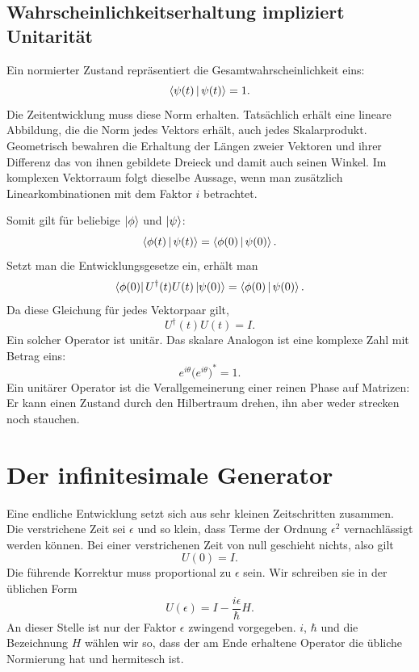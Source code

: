 \subsection{Wahrscheinlichkeitserhaltung impliziert Unitarität}

Ein normierter Zustand repräsentiert die Gesamtwahrscheinlichkeit eins:
\begin{equation}
\left\langle\psi(t)\,\middle|\,\psi(t)\right\rangle=1.
\end{equation}
Die Zeitentwicklung muss diese Norm erhalten. Tatsächlich erhält eine lineare Abbildung, die die Norm jedes Vektors erhält, auch jedes Skalarprodukt. Geometrisch bewahren die Erhaltung der Längen zweier Vektoren und ihrer Differenz das von ihnen gebildete Dreieck und damit auch seinen Winkel. Im komplexen Vektorraum folgt dieselbe Aussage, wenn man zusätzlich Linearkombinationen mit dem Faktor \(i\) betrachtet.

Somit gilt für beliebige \(\left\lvert\phi\right\rangle\) und \(\left\lvert\psi\right\rangle\):
\begin{equation}
\left\langle\phi(t)\,\middle|\,\psi(t)\right\rangle
=
\left\langle\phi(0)\,\middle|\,\psi(0)\right\rangle.
\end{equation}
Setzt man die Entwicklungsgesetze ein, erhält man
\begin{equation}
\left\langle\phi(0)\right\rvert U^\dagger(t)U(t)\left\lvert\psi(0)\right\rangle
=
\left\langle\phi(0)\,\middle|\,\psi(0)\right\rangle.
\end{equation}
Da diese Gleichung für jedes Vektorpaar gilt,
\begin{equation}
\boxed{U^\dagger(t)U(t)=I}.
\end{equation}
Ein solcher Operator ist unitär. Das skalare Analogon ist eine komplexe Zahl mit Betrag eins:
\begin{equation}
e^{i\theta}\bigl(e^{i\theta}\bigr)^*=1.
\end{equation}
Ein unitärer Operator ist die Verallgemeinerung einer reinen Phase auf Matrizen: Er kann einen Zustand durch den Hilbertraum drehen, ihn aber weder strecken noch stauchen.

\section{Der infinitesimale Generator}

Eine endliche Entwicklung setzt sich aus sehr kleinen Zeitschritten zusammen. Die verstrichene Zeit sei \(\epsilon\) und so klein, dass Terme der Ordnung \(\epsilon^2\) vernachlässigt werden können. Bei einer verstrichenen Zeit von null geschieht nichts, also gilt
\begin{equation}
U(0)=I.
\end{equation}
Die führende Korrektur muss proportional zu \(\epsilon\) sein. Wir schreiben sie in der üblichen Form
\begin{equation}
\boxed{U(\epsilon)=I-\frac{i\epsilon}{\hbar}H}.
\end{equation}
An dieser Stelle ist nur der Faktor \(\epsilon\) zwingend vorgegeben. \(i\), \(\hbar\) und die Bezeichnung \(H\) wählen wir so, dass der am Ende erhaltene Operator die übliche Normierung hat und hermitesch ist.

